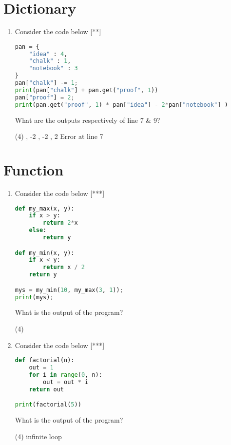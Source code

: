 \documentclass[11pt]{amsart}
\begin{document}
\section{Dictionary}
\begin{enumerate}
\item Consider the code below [**]
\begin{lstlisting}[language=Python]
pan = {
	"idea" : 4,
	"chalk" : 1,
	"notebook" : 3
}
pan["chalk"] -= 1;
print(pan["chalk"] + pan.get("proof", 1))
pan["proof"] = 2;
print(pan.get("proof", 1) * pan["idea"] - 2*pan["notebook"] )
\end{lstlisting}
What are the outputs respectively of line 7 \& 9?
\begin{tasks}(4)
	, -2
	, -2
	, 2
	\task Error at line 7
\end{tasks}
\end{enumerate}

\section{Function}
\begin{enumerate}
\item Consider the code below [***]
\begin{lstlisting}[language=Python]
def my_max(x, y):
	if x > y:
		return 2*x
	else:
		return y

def my_min(x, y):
	if x < y:
		return x / 2
	return y

mys = my_min(10, my_max(3, 1));
print(mys);

\end{lstlisting}
What is the output of the program?
\begin{tasks}(4)
\end{tasks}

\item Consider the code below [***]
\begin{lstlisting}[language=Python]
def factorial(n):
	out = 1
	for i in range(0, n):
		out = out * i
	return out

print(factorial(5))


\end{lstlisting}
What is the output of the program?
\begin{tasks}(4)
	\task infinite loop
\end{tasks}
\end{enumerate}
\end{document}
